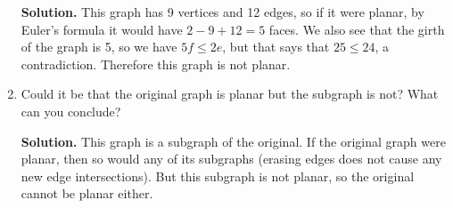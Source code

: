 \documentclass{book}
\begin{document}
\begin{activity}[]
\begin{enumerate}[font=\bfseries,label=(\alph*),ref=\alph*]
\par\smallskip%
\noindent\textbf{Solution.}\hypertarget{solution-23}{}\quad%
\hypertarget{p-305}{}%
This graph has 9 vertices and 12 edges, so if it were planar, by Euler's formula it would have \(2 - 9 + 12 = 5\) faces.  We also see that the girth of the graph is 5, so we have \(5f \le 2e\), but that says that \(25 \le 24\), a contradiction.  Therefore this graph is not planar.%
\item\label{task-43} \hypertarget{p-306}{}%
Could it be that the original graph is planar but the subgraph is not?  What can you conclude?%
\par\smallskip%
\noindent\textbf{Solution.}\hypertarget{solution-24}{}\quad%
\hypertarget{p-307}{}%
This graph is a subgraph of the original.  If the original graph were planar, then so would any of its subgraphs (erasing edges does not cause any new edge intersections).  But this subgraph is not planar, so the original cannot be planar either.%
\end{enumerate}
\end{activity}
\end{document}
